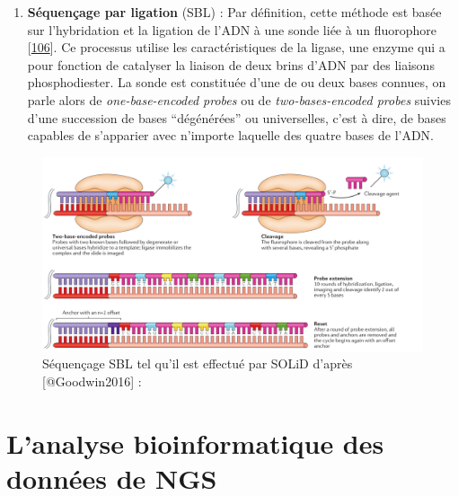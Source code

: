 \documentclass[12pt,twoside]{reedthesis}
\providecommand{\tightlist}{%
  \setlength{\itemsep}{0pt}\setlength{\parskip}{0pt}}
\theoremstyle{definition}
\theoremstyle{definition}
\theoremstyle{remark}
\begin{document}
  \newpage
  
  \begin{enumerate}
  \def\labelenumi{\arabic{enumi}.}
  \setcounter{enumi}{1}
  \tightlist
  \item
    \textbf{Séquençage par ligation} (SBL) : Par définition, cette méthode
    est basée sur l'hybridation et la ligation de l'ADN à une sonde liée à
    un fluorophore {[}\protect\hyperlink{ref-Tomkinson2006}{106}{]}. Ce
    processus utilise les caractéristiques de la ligase, une enzyme qui a
    pour fonction de catalyser la liaison de deux brins d'ADN par des
    liaisons phosphodiester. La sonde est constituée d'une de ou deux
    bases connues, on parle alors de \emph{one-base-encoded probes} ou de
    \emph{two-bases-encoded probes} suivies d'une succession de bases
    ``dégénérées'' ou universelles, c'est à dire, de bases capables de
    s'apparier avec n'importe laquelle des quatre bases de l'ADN.
  \end{enumerate}
  
  \begin{figure}
  
  {\centering \includegraphics[scale=.26]{figure/SBL_seq_solid} 
  
  }
  
  \caption[Séquençage SBL tel qu'il est effectué par SOLiD]{Séquençage SBL tel qu'il est effectué par SOLiD d'après [@Goodwin2016] : }\label{fig:sblSeq}
  \end{figure}
  
  \newpage  
  
  \section{L'analyse bioinformatique des données de
  NGS}\label{lanalyse-bioinformatique-des-donnees-de-ngs}
  
\end{document}
